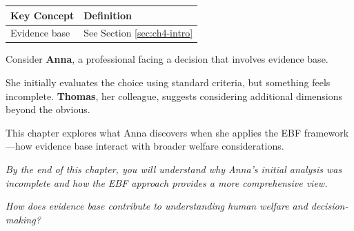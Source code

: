 %
%
%
%
%


\begin{tcolorbox}[
    colback=gray!5!white,
    colframe=gray!75!black,
    title={\textbf{Begriffe in diesem Kapitel}},
    fonttitle=\bfseries
]
\small
\begin{tabular}{@{}ll@{}}
\textbf{Key Concept} & \textbf{Definition} \\
\midrule
Evidence base & See Section \ref{sec:ch4-intro} \\
\end{tabular}
\end{tcolorbox}



\begin{tcolorbox}[
    colback=blue!5!white,
    colframe=blue!75!black,
    title={\textbf{Intuition: A Motivating Example}},
    fonttitle=\bfseries
]
Consider \textbf{Anna}, a professional facing a decision that involves evidence base.

She initially evaluates the choice using standard criteria, but something feels incomplete.
\textbf{Thomas}, her colleague, suggests considering additional dimensions beyond the obvious.

This chapter explores what Anna discovers when she applies the EBF framework---how
evidence base interact with broader welfare considerations.

\medskip
\textit{By the end of this chapter, you will understand why Anna's initial analysis
was incomplete and how the EBF approach provides a more comprehensive view.}
\end{tcolorbox}



\begin{tcolorbox}[
    colback=red!5!white,
    colframe=red!75!black,
    title={\textbf{Central Question}},
    fonttitle=\bfseries
]
\Large
\centering
\textit{How does evidence base contribute to understanding human welfare and decision-making?}
\end{tcolorbox}



